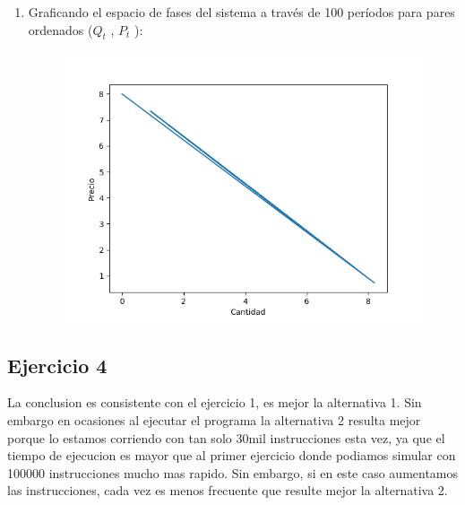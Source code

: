 \documentclass[11pt,a4paper]{article}
\begin{document}
\begin{enumerate}
			\item Graficando el espacio de fases del sistema a través de 100 períodos para pares ordenados ($Q_t$ , $P_t$ ):
				\begin{figure}[H]
  					\centering
    					\includegraphics[width=14cm]{imagenes/diagramaDeFases}
				\end{figure}

		\end{enumerate}
		
		

	\subsection{Ejercicio 4}
		La conclusion es consistente con el ejercicio 1, es mejor la alternativa 1. Sin embargo en ocasiones al ejecutar el programa la alternativa 2 resulta mejor porque lo estamos corriendo con tan solo 30mil instrucciones esta vez, ya que el tiempo de ejecucion es mayor que al primer ejercicio donde podiamos simular con 100000 instrucciones mucho mas rapido. Sin embargo, si en este caso aumentamos las instrucciones, cada vez es menos frecuente que resulte mejor la alternativa 2.
\end{document}
